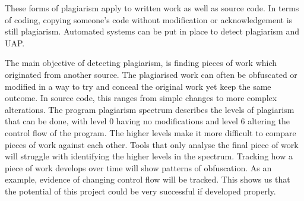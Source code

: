 These forms of plagiarism apply to written work as well as source code. In terms of coding, copying someone's code without modification or acknowledgement is still plagiarism. Automated systems can be put in place to detect plagiarism and UAP.

The main objective of detecting plagiarism, is finding pieces of work which originated from another source. The plagiarised work can often be obfuscated or modified in a way to try and conceal the original work yet keep the same outcome. In source code, this ranges from simple changes to more complex alterations. The program plagiarism spectrum describes the levels of plagiarism that can be done, with level 0 having no modifications and level 6 altering the control flow of the program\cite{Parker1989}. The higher levels make it more difficult to compare pieces of work against each other. Tools that only analyse the final piece of work will struggle with identifying the higher levels in the spectrum. Tracking how a piece of work develops over time will show patterns of obfuscation. As an example, evidence of changing control flow will be tracked. This shows us that the potential of this project could be very successful if developed properly.
